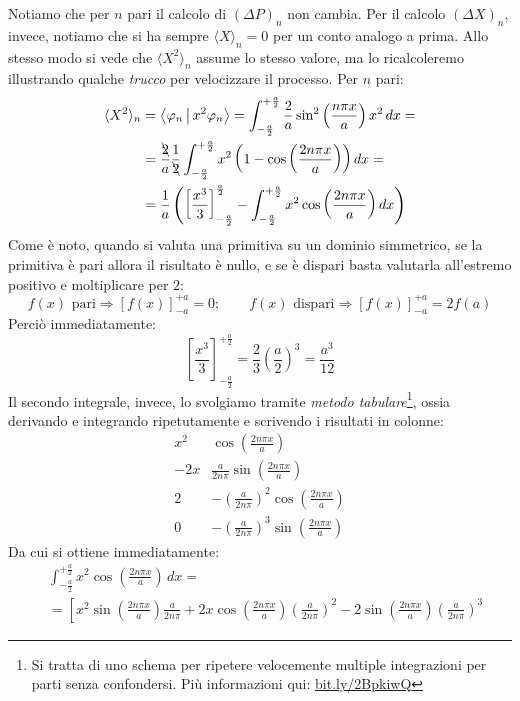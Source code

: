 \documentclass[../../FisicaTeorica.tex]{subfiles}
\begin{document}
\begin{enumerate}
Notiamo che per $n$ pari il calcolo di $(\Delta P)_n$ non cambia. Per il calcolo $(\Delta X)_n$, invece, notiamo che si ha sempre $\langle X\rangle_n = 0$ per un conto analogo a prima. Allo stesso modo si vede che $\langle X^2 \rangle_n$ assume lo stesso valore, ma lo ricalcoleremo illustrando qualche \textit{trucco} per velocizzare il processo. Per $n$ pari:
\begin{align*}
\langle X^2\rangle_n &= \Braket{\varphi_n | x^2 \varphi_n} = \int_{-\frac{a}{2}}^{+\frac{a}{2}} \frac{2}{a}\sin^2 \left(\frac{n\pi x}{a}\right) x^2\,dx=\\
&= \frac{\bcancel{2}}{a}\frac{1}{\bcancel{2}} \int_{-\frac{a}{2}}^{+\frac{a}{2}} x^2 \left(1-\cos\left(\frac{2n\pi x}{a}\right)\right)dx =\\
&= \frac{1}{a}\left(\left[\frac{x^3}{3}\right]_{-\frac{a}{2}}^{\frac{a}{2}}- \int_{-\frac{a}{2}}^{+\frac{a}{2}} x^2 \cos\left(\frac{2n\pi x}{a}\right) dx\right)
\end{align*}
Come è noto, quando si valuta una primitiva su un dominio simmetrico, se la primitiva è pari allora il risultato è nullo, e se è dispari basta valutarla all'estremo positivo e moltiplicare per $2$:
\[
f(x) \text{ pari} \Rightarrow [f(x)]_{-a}^{+a}=0; \qquad f(x) \text{ dispari}\Rightarrow [f(x)]_{-a}^{+a}=2f(a)
\]
Perciò immediatamente:
\[
\left[\frac{x^3}{3}\right]_{-\frac{a}{2}}^{+\frac{a}{2}}=\frac{2}{3}\left(\frac{a}{2}\right)^3=\frac{a^3}{12}
\]
Il secondo integrale, invece, lo svolgiamo tramite \textit{metodo tabulare}\footnote{Si tratta di uno schema per ripetere velocemente multiple integrazioni per parti senza confondersi. Più informazioni qui: \url{bit.ly/2BpkiwQ}}, ossia derivando e integrando ripetutamente e scrivendo i risultati in colonne:
\[
\begin{array}{c|c}
x^2 & \cos\left(\frac{2n\pi x}{a}\right)\\ \hline 
-2x & \frac{a}{2n\pi}\sin\left(\frac{2n\pi x}{a}\right)\\
2 & -\left(\frac{a}{2n\pi}\right)^2\cos\left(\frac{2n\pi x}{a}\right)\\
0 & -\left(\frac{a}{2n\pi}\right)^3 \sin\left(\frac{2n\pi x}{a}\right)
\end{array}
\]
Da cui si ottiene immediatamente:
\begin{align*}
&\int_{-\frac{a}{2}}^{+\frac{a}{2}} x^2 \cos\left(\frac{2n\pi x}{a}\right)\,dx = \\
&= \left[
x^2 \sin\left(\frac{2n\pi x}{a}\right)\frac{a}{2n\pi} + 2x \cos\left(\frac{2n\pi x}{a}\right)\left(\frac{a}{2n\pi}\right)^2-2\sin\left(\frac{2n\pi x}{a}\right)\left(\frac{a}{2n\pi}\right)^3

\end{align*}
\end{enumerate}
\end{document}
